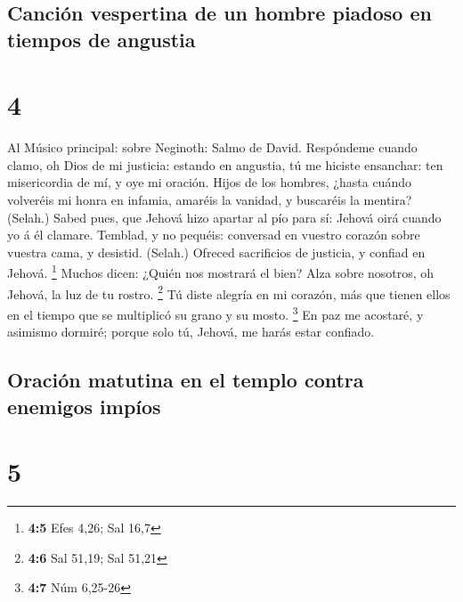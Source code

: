 \hypertarget{canciuxf3n-vespertina-de-un-hombre-piadoso-en-tiempos-de-angustia}{%
\subsection{Canción vespertina de un hombre piadoso en tiempos de
angustia}\label{canciuxf3n-vespertina-de-un-hombre-piadoso-en-tiempos-de-angustia}}

\hypertarget{section-3}{%
\section{4}\label{section-3}}

 Al Músico principal: sobre Neginoth: Salmo de David.
Respóndeme cuando clamo, oh Dios de mi justicia: estando en angustia, tú
me hiciste ensanchar: ten misericordia de mí, y oye mi oración.
 Hijos de los hombres, ¿hasta cuándo volveréis mi honra en
infamia, amaréis la vanidad, y buscaréis la mentira? (Selah.)
 Sabed pues, que Jehová hizo apartar al pío para sí: Jehová
oirá cuando yo á él clamare.  Temblad, y no pequéis:
conversad en vuestro corazón sobre vuestra cama, y desistid. (Selah.)
 Ofreced sacrificios de justicia, y confiad en Jehová.
\footnote{\textbf{4:5} Efes 4,26; Sal 16,7}  Muchos dicen:
¿Quién nos mostrará el bien? Alza sobre nosotros, oh Jehová, la luz de
tu rostro. \footnote{\textbf{4:6} Sal 51,19; Sal 51,21}  Tú
diste alegría en mi corazón, más que tienen ellos en el tiempo que se
multiplicó su grano y su mosto. \footnote{\textbf{4:7} Núm 6,25-26}
 En paz me acostaré, y asimismo dormiré; porque solo tú,
Jehová, me harás estar confiado.

\hypertarget{oraciuxf3n-matutina-en-el-templo-contra-enemigos-impuxedos}{%
\subsection{Oración matutina en el templo contra enemigos
impíos}\label{oraciuxf3n-matutina-en-el-templo-contra-enemigos-impuxedos}}

\hypertarget{section-4}{%
\section{5}\label{section-4}}

